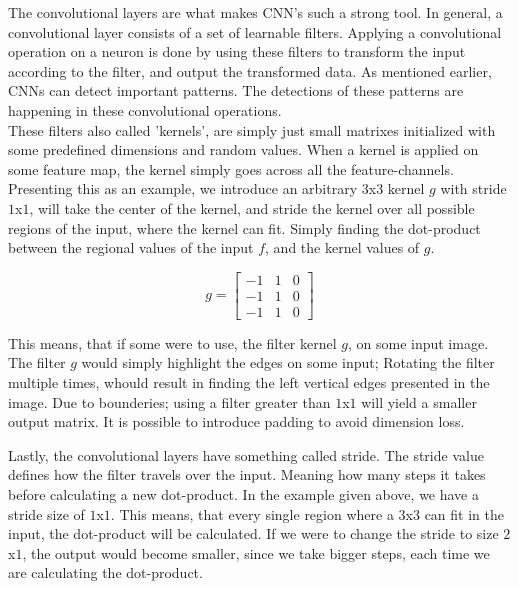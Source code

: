 The convolutional layers are what makes CNN's such a strong tool. In general, a convolutional layer consists of a set of learnable filters. Applying a convolutional operation on a neuron is done by using these filters to transform the input according to the filter, and output the transformed data. As mentioned earlier, CNNs can detect important patterns. The detections of these patterns are happening in these convolutional operations.\\

\noindent
These filters also called 'kernels', are simply just small matrixes initialized with some predefined dimensions and random values. When a kernel is applied on some feature map, the kernel simply goes across all the feature-channels.\\

\noindent
Presenting this as an example, we introduce an arbitrary $3$x$3$ kernel $g$ with stride $1$x$1$, will take the center of the kernel, and stride the kernel over all possible regions of the input, where the kernel can fit. Simply finding the dot-product between the regional values of the input $f$, and the kernel values of $g$.

$$ g = \begin{bmatrix}
-1 & 1 & 0 \\
-1 & 1 & 0 \\
-1 & 1 & 0
\end{bmatrix}
$$

\noindent
This means, that if some were to use, the filter kernel $g$, on some input image. The filter $g$ would simply highlight the edges on some input; Rotating the filter multiple times, whould result in finding the left vertical edges presented in the image. Due to bounderies; using a filter greater than $1$x$1$ will yield a smaller output matrix. It is possible to introduce padding to avoid dimension loss.

\noindent
Lastly, the convolutional layers have something called stride. The stride value defines how the filter travels over the input. Meaning how many steps it takes before calculating a new dot-product. In the example given above, we have a stride size of $1$x$1$. This means, that every single region where a $3$x$3$ can fit in the input, the dot-product will be calculated. If we were to change the stride to size $2$x$1$, the output would become smaller, since we take bigger steps, each time we are calculating the dot-product.

